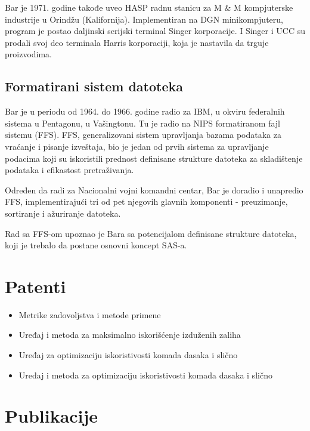 \documentclass[a4paper]{article}
\begin{document}
{		Bar je 1971. godine takođe uveo HASP radnu stanicu za M \&  M kompjuterske industrije u Orindžu (Kalifornija). Implementiran na DGN minikompjuteru, program je postao daljinski serijski terminal Singer korporacije. I Singer i UCC su prodali svoj deo terminala Harris korporaciji, koja je nastavila da trguje proizvodima.
		
		\subsection{Formatirani sistem datoteka}
		Bar je u periodu od 1964. do 1966. godine radio za IBM, u okviru federalnih sistema u Pentagonu, u Vašingtonu. Tu je radio na NIPS formatiranom fajl sistemu (FFS). FFS, generalizovani sistem upravljanja bazama podataka za vraćanje i pisanje izveštaja, bio je jedan od prvih sistema za upravljanje podacima koji su iskoristili prednost definisane strukture datoteka za skladištenje podataka i efikastost pretraživanja.
		
		Određen da radi za Nacionalni vojni komandni centar, Bar je doradio i unapredio FFS, implementirajući tri od pet njegovih glavnih komponenti - preuzimanje, sortiranje i ažuriranje datoteka.
		
		Rad sa FFS-om upoznao je Bara sa potencijalom definisane strukture datoteka, koji je trebalo da postane osnovni koncept SAS-a.
		
		
		\newpage
		
		
		\section{Patenti}
		
		\begin{itemize}
			\item Metrike zadovoljstva i metode primene
			\item Uređaj i metoda za maksimalno iskorišćenje izduženih zaliha
			\item Uređaj za optimizaciju iskoristivosti komada dasaka i slično
			\item Uređaj i metoda za optimizaciju iskoristivosti komada dasaka i slično
		\end{itemize}
		
		\section{Publikacije}
		
}
\end{document}
